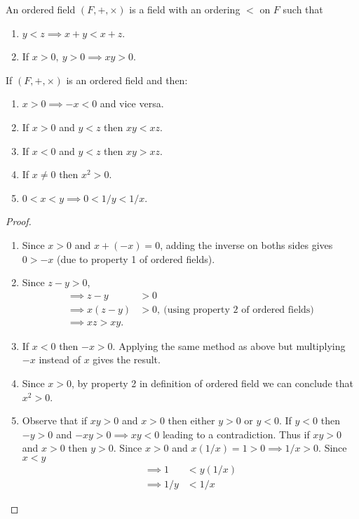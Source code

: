 \begin{definition}
  An ordered field $(F, +, \times )$ is a field with an ordering $<$ on $F$ such that
  \begin{enumerate}
    \item $y<z \implies x+y < x+z$.
    \item If $x>0,\ y>0 \implies xy>0 $.
  \end{enumerate}
\end{definition}
\begin{proposition}
  If $(F,+,\times)$ is an ordered field and then:
  \begin{enumerate}
    \item $x>0 \implies -x<0$ and vice versa.
    \item If $x>0$ and $y<z$ then $xy<xz$.
    \item If $x<0$ and $y<z$ then $xy>xz$.
    \item If $x\neq 0$ then $x^2 >0$.
    \item $0<x<y\implies 0<1/y<1/x$.
  \end{enumerate}
\end{proposition}
\begin{proof}
  \begin{enumerate}
    \item Since $x>0$ and $x+ (-x) = 0$, adding the inverse on boths sides gives $0>-x$ (due to property 1 of ordered fields).
    \item Since $z-y>0$,
      \begin{align*}
        \implies z-y &> 0\\
        \implies x(z-y) &> 0,\ \text{(using property 2 of ordered fields)}\\
        \implies xz > xy.
      \end{align*}
    \item If $x<0$ then $-x>0$. Applying the same method as above but multiplying $-x$ instead of $x$ gives the result. 
    \item Since $x>0$, by property 2 in definition of ordered field we can conclude that $x^2>0$.
    \item Observe that if $xy>0$ and $x>0$ then either $y>0$ or $y<0$. If $y<0$ then $-y>0$ and $-xy > 0 \implies xy < 0$ leading to a contradiction. Thus if $xy>0$ and $x>0$ then $y>0$. Since $x>0$ and $x(1/x) = 1 > 0 \implies 1/x >0$. Since $x<y$
      \begin{align*}
        \implies 1&< y(1/x)\\
        \implies 1/y &< 1/x
      \end{align*}
  \end{enumerate}
\end{proof}
